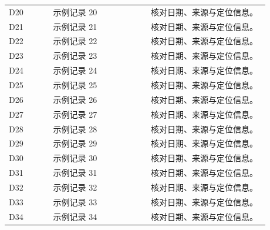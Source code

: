 \documentclass[UTF8,a4paper,fontset=fandol]{ctexart}
\begin{document}
\begin{longtable}{@{}p{0.15\linewidth}p{0.33\linewidth}p{0.40\linewidth}@{}}
  D20 & 示例记录 20 & 核对日期、来源与定位信息。\\[4pt]
  D21 & 示例记录 21 & 核对日期、来源与定位信息。\\[4pt]
  D22 & 示例记录 22 & 核对日期、来源与定位信息。\\[4pt]
  D23 & 示例记录 23 & 核对日期、来源与定位信息。\\[4pt]
  D24 & 示例记录 24 & 核对日期、来源与定位信息。\\[4pt]
  D25 & 示例记录 25 & 核对日期、来源与定位信息。\\[4pt]
  D26 & 示例记录 26 & 核对日期、来源与定位信息。\\[4pt]
  D27 & 示例记录 27 & 核对日期、来源与定位信息。\\[4pt]
  D28 & 示例记录 28 & 核对日期、来源与定位信息。\\[4pt]
  D29 & 示例记录 29 & 核对日期、来源与定位信息。\\[4pt]
  D30 & 示例记录 30 & 核对日期、来源与定位信息。\\[4pt]
  D31 & 示例记录 31 & 核对日期、来源与定位信息。\\[4pt]
  D32 & 示例记录 32 & 核对日期、来源与定位信息。\\[4pt]
  D33 & 示例记录 33 & 核对日期、来源与定位信息。\\[4pt]
  D34 & 示例记录 34 & 核对日期、来源与定位信息。\\[4pt]
\end{longtable}
\end{document}
